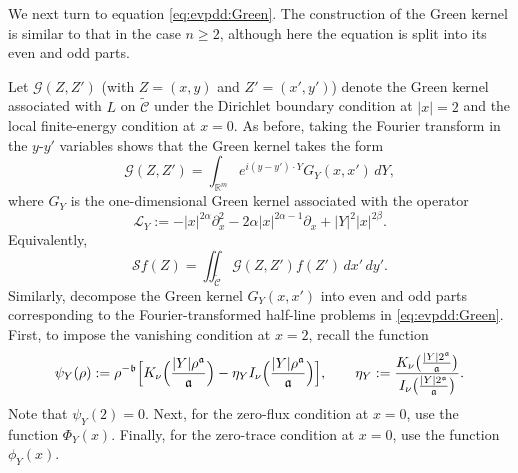 \documentclass[12pt]{amsart}
\begin{document}
We next turn to equation \eqref{eq:evpdd:Green}. The construction of the Green kernel is similar to that in the case $n\ge 2$, although here the equation is split into its even and odd parts.

Let $\mathcal{G}(Z,Z')$ (with $Z = (x,y)$ and $Z' = (x',y')$) denote the Green kernel associated with $L$ on $\widetilde{\mathcal{C}}$ under the Dirichlet boundary condition at $|x|=2$ and the local finite-energy condition at $x=0$. As before, taking the Fourier transform in the $y$-$y'$ variables shows that the Green kernel takes the form
\begin{equation}\label{eq_Green_kernel:n=1}
    \mathcal{G}(Z,Z') =  \int_{\mathbb{R}^m} e^{i(y-y') \cdot Y} G_{Y}(x, x') \, dY,
\end{equation}
where $G_{Y}$ is the one-dimensional Green kernel associated with the operator
\begin{equation*}
    \mathcal{L}_{Y} := - |x|^{2\alpha} \partial_{x}^2 - 2\alpha |x|^{2\alpha-1} \partial_x + |Y|^2 |x|^{2\beta}.
\end{equation*}
Equivalently,
\begin{equation*}
    \mathcal{S}f(Z) = \iint_{\widetilde{\mathcal{C}}} \mathcal{G}(Z,Z') f(Z') \, dx' \, dy'.
\end{equation*}
Similarly, decompose the Green kernel $G_Y(x,x')$ into even and odd parts corresponding to the Fourier-transformed half-line problems in \eqref{eq:evpdd:Green}. First, to impose the vanishing condition at $x=2$, recall the function
\begin{equation}\label{eq:psi}
    \psi_{Y}(\rho):= \rho^{-\mathfrak b} \Bigl[ K_{\nu}\Bigl( \frac{|Y| \rho^{\mathfrak a}}{\mathfrak a} \Bigr) - \eta_Y I_{\nu} \Bigl( \frac{|Y| \rho^{\mathfrak a}}{\mathfrak a} \Bigr) \Bigr], \qquad \eta_Y:= \frac{K_{\nu} \bigl( \frac{|Y| 2^{\mathfrak a}}{\mathfrak a} \bigr)}{I_{\nu} \bigl( \frac{|Y| 2^{\mathfrak a}}{\mathfrak a} \bigr)}.
\end{equation}
Note that $\psi_{Y}(2)=0$. Next, for the zero-flux condition at $x=0$, use the function $\Phi_Y(x)$. Finally, for the zero-trace condition at $x=0$, use the function $\phi_Y(x)$.
\end{document}
